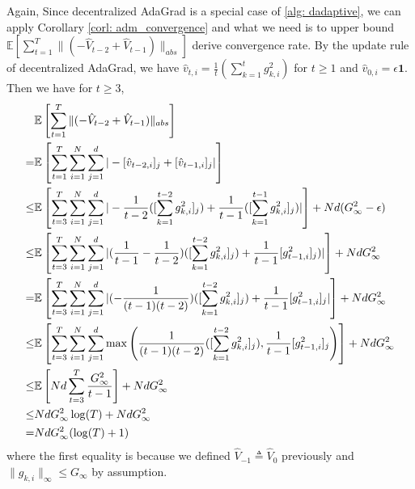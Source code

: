 \documentclass[11pt]{article}
\begin{document}
Again, Since decentralized AdaGrad is a special case of \ref{alg: dadaptive}, we can apply Corollary \ref{corl: adm_convergence} and what we need is to upper bound  $\mathbb E \left[ \sum_{t=1}^{T}   \|    (- \hat V_{t-2} + \hat V_{t-1} ) \|_{abs} \right]  $  derive convergence rate.  By the update rule of decentralized AdaGrad, we have $\hat v_{t,i} = \frac{1}{t}( \sum_{k=1}^{t}g_{k,i}^2)$ for $t \geq 1$ and $\hat v_{0,i} = \epsilon \mathbf 1$. Then we have for $t \geq 3$,
\begin{align}\notag
\begin{split}
&\mathbb E \left[ \sum_{t=1}^{T}   \|    (- \hat V_{t-2} + \hat V_{t-1} ) \|_{abs} \right] \\
= &\mathbb E \left[ \sum_{t=1}^{T}  \sum_{i=1}^N \sum_{j=1}^d    |- [\hat v_{t-2,i}]_j + [\hat v_{t-1,i}]_j | \right]    \\
\leq &\mathbb E \left[ \sum_{t=3}^{T}  \sum_{i=1}^N \sum_{j=1}^d    |- \frac{1}{t-2}( [\sum_{k=1}^{t-2}g_{k,i}^2]_j) + \frac{1}{t-1}([ \sum_{k=1}^{t-1}g_{k,i}^2]_j )| \right] + Nd (G_{\infty}^2 - \epsilon)  \\
\leq &\mathbb E \left[ \sum_{t=3}^{T}  \sum_{i=1}^N \sum_{j=1}^d    | (\frac{1}{t-1} - \frac{1}{t-2})( [\sum_{k=1}^{t-2}g_{k,i}^2]_j) + \frac{1}{t-1} [g_{t-1,i}^2]_j )| \right] +  Nd G_{\infty}^2    \\
=  &\mathbb E \left[ \sum_{t=3}^{T}  \sum_{i=1}^N \sum_{j=1}^d    | (-\frac{1}{(t-1)(t-2)} )( [\sum_{k=1}^{t-2}g_{k,i}^2]_j) + \frac{1}{t-1}[g_{t-1,i}^2]_j | \right]    +  Nd G_{\infty}^2 \\
\leq &\mathbb E \left[ \sum_{t=3}^{T}  \sum_{i=1}^N \sum_{j=1}^d    \max\left( \frac{1}{(t-1)(t-2)} ( [\sum_{k=1}^{t-2}g_{k,i}^2]_j) , \frac{1}{t-1}[g_{t-1,i}^2]_j \right) \right]    +  Nd G_{\infty}^2 \\
\leq  &\mathbb E \left[ N d \sum_{t=3}^{T}      \frac{G_{\infty}^2}{t-1}   \right]   +  Nd G_{\infty}^2 \\
\leq & Nd G_{\infty}^2 \log (T) +  Nd G_{\infty}^2 \\
= & NdG_{\infty}^2 (\log (T) + 1)
\end{split}
\end{align}
where the first equality is because  we defined $\hat V_{-1} \triangleq \hat V_0$  previously and $\|g_{k,i}\|_{\infty} \leq G_{\infty}$ by assumption.
\end{document}
